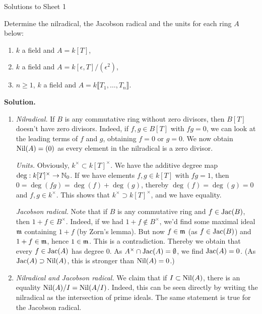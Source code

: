 \documentclass[a4paper,11pt]{article}
\begin{document}
\begin{center}
    \huge{Solutions to Sheet 1}
\end{center}

Determine the nilradical, the Jacobson radical and the units for each
ring $A$ below:
\begin{enumerate}
    \item $k$ a field and $A = k[T]$,
    \item $k$ a field and $A = k[\epsilon, T]/(\epsilon^2)$,
    \item $n \geq 1$, $k$ a field and $A = k \llbracket T_1, \dots, T_n \rrbracket$. 
\end{enumerate}
\textbf{Solution.}
\begin{enumerate}
    \item \textit{Nilradical.} If $B$ is any commutative ring without
        zero divisors, then $B[T]$ doesn't have zero divisors. Indeed,
        if $f, g \in B[T]$ with $fg = 0$, we can look at the leading terms
        of $f$ and $g$, obtaining $f = 0$ or $g = 0$. We now obtain $\operatorname{Nil}(A) = (0)$
        as every element in the nilradical is a zero divisor.

        \textit{Units.} Obviously, $k^\times \subset k[T]^\times$.
        We have the additive degree map $\deg: k[T]^\times \to \mathbb{N}_0$. If
        we have elements $f,g \in k[T]$ with $fg = 1$,
        then $0 = \deg (fg) = \deg(f) + \deg(g)$, thereby $\deg(f) = \deg(g) = 0$
        and $f,g \in k^\times$. This shows that $k^\times \supset k[T]^\times$,
        and we have equality. 

        \textit{Jacobson radical.} Note that if $B$ is any commutative 
        ring and $f \in \operatorname{Jac}(B)$, then $1 + f \in B^\times$. Indeed, if we had
        $1 + f \not \in B^\times$, we'd find some maximal ideal $\mathfrak{m}$ containing
        $1 + f$ (by Zorn's lemma). But now $f \in \mathfrak{m}$ (as $f \in \operatorname{Jac}(B)$)
        and $1 + f \in \mathfrak{m}$, hence $1 \in \mathfrak{m}$. This is a contradiction. 
        Thereby we obtain
        that every $f \in \operatorname{Jac}(A)$ has degree $0$. As $A^\times \cap \operatorname{Jac}(A) =
        \emptyset$, we find $\operatorname{Jac}(A) = 0$. (As $\operatorname{Jac}(A) \supset \operatorname{Nil}(A)$, this
        is stronger than $\operatorname{Nil}(A) = 0$.) 
    \item \textit{Nilradical and Jacobson radical.} We claim that if $I \subset
        \operatorname{Nil}(A)$, there is an equality $\operatorname{Nil}(A)/I = \operatorname{Nil}(A/I)$. Indeed, this
        can be seen directly by writing the nilradical as the intersection of
        prime ideals. The same statement is true for the Jacobson radical. 


\end{enumerate}
\end{document}
